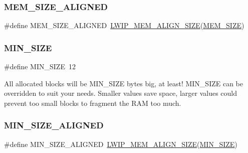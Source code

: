 \subsubsection{\texorpdfstring{M\+E\+M\+\_\+\+S\+I\+Z\+E\+\_\+\+A\+L\+I\+G\+N\+ED}{MEM\_SIZE\_ALIGNED}}
{\footnotesize\ttfamily \#define M\+E\+M\+\_\+\+S\+I\+Z\+E\+\_\+\+A\+L\+I\+G\+N\+ED~\hyperlink{group__compiler__abstraction_gaef204be511fd32f681b55abc08e9ae18}{L\+W\+I\+P\+\_\+\+M\+E\+M\+\_\+\+A\+L\+I\+G\+N\+\_\+\+S\+I\+ZE}(\hyperlink{openmote-cc2538_2lwip_2test_2unit_2lwipopts_8h_a2dcf8c45f945dd0c4301a94700f2112c}{M\+E\+M\+\_\+\+S\+I\+ZE})}

\mbox{\label{openmote-cc2538_2lwip_2src_2core_2mem_8c_a278694c2333c9826f21ddd2c2d220f66}} 
\subsubsection{\texorpdfstring{M\+I\+N\+\_\+\+S\+I\+ZE}{MIN\_SIZE}}
{\footnotesize\ttfamily \#define M\+I\+N\+\_\+\+S\+I\+ZE~12}

All allocated blocks will be M\+I\+N\+\_\+\+S\+I\+ZE bytes big, at least! M\+I\+N\+\_\+\+S\+I\+ZE can be overridden to suit your needs. Smaller values save space, larger values could prevent too small blocks to fragment the R\+AM too much. \mbox{\label{openmote-cc2538_2lwip_2src_2core_2mem_8c_a97c704b85f71b6e61b0098b4a0a743cd}} 
\subsubsection{\texorpdfstring{M\+I\+N\+\_\+\+S\+I\+Z\+E\+\_\+\+A\+L\+I\+G\+N\+ED}{MIN\_SIZE\_ALIGNED}}
{\footnotesize\ttfamily \#define M\+I\+N\+\_\+\+S\+I\+Z\+E\+\_\+\+A\+L\+I\+G\+N\+ED~\hyperlink{group__compiler__abstraction_gaef204be511fd32f681b55abc08e9ae18}{L\+W\+I\+P\+\_\+\+M\+E\+M\+\_\+\+A\+L\+I\+G\+N\+\_\+\+S\+I\+ZE}(\hyperlink{openmote-cc2538_2lwip_2src_2core_2mem_8c_a278694c2333c9826f21ddd2c2d220f66}{M\+I\+N\+\_\+\+S\+I\+ZE})}

